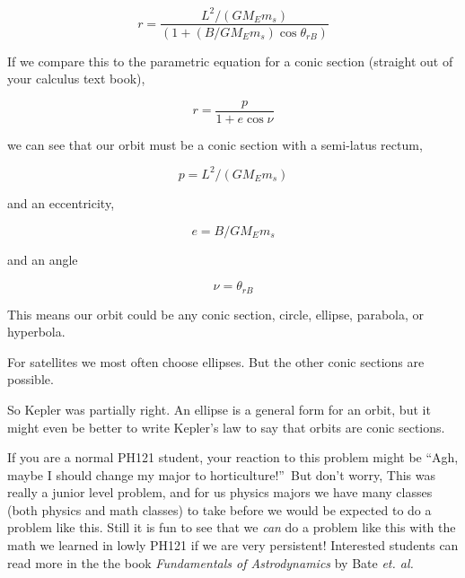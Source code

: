 $$r=\frac{L^{2}/\left( GM_{E}m_{s}\right) }{\left( 1+\left(B/GM_{E}m_{s}\right) \cos \theta _{rB}\right) } $$

If we compare this to the parametric equation for a conic section (straight out of your calculus text book), 

$$r=\frac{p}{1+e\cos \nu } $$

we can see that our orbit must be a conic section with a semi-latus rectum, 

$$p=L^{2}/\left( GM_{E}m_{s}\right) $$

and an eccentricity, 
 
$$e=B/GM_{E}m_{s}$$

and an angle 

$$\nu =\theta _{rB}$$

This means our orbit could be any conic section, circle, ellipse, parabola, or hyperbola.

For satellites we most often choose ellipses. But the other conic sections are possible.

So Kepler was partially right. An ellipse is a general form for an orbit, but it might even be better to write Kepler's law to say that orbits are conic sections.


If you are a normal PH121 student, your reaction to this problem might be \textquotedblleft Agh, maybe I should change my major to
horticulture!\textquotedblright\ But don't worry, This was really a junior level problem, and for us physics majors we have many classes (both physics and math classes) to take before we would be expected to do a problem like this. Still it is fun to see that we \emph{can} do a problem like this with the math we learned in lowly PH121 if we are very persistent!  Interested students can read more in the the book \textit{Fundamentals of Astrodynamics} by Bate \textit{et. al.} \cite{Bate1971}
	
